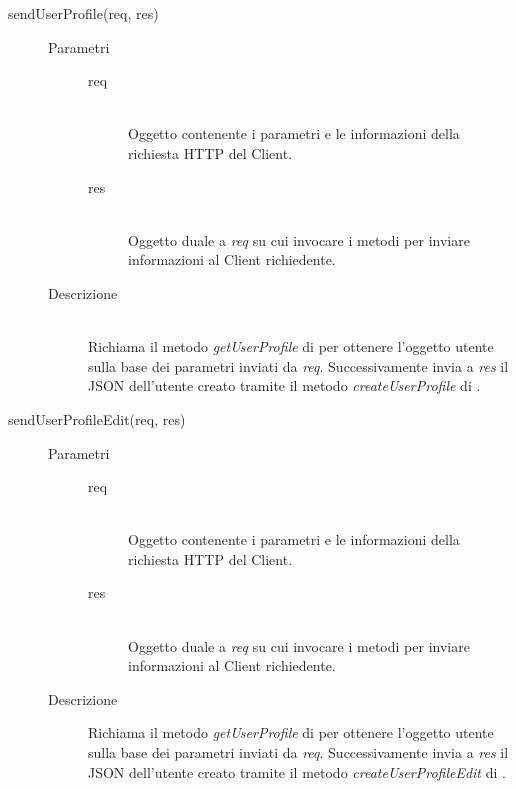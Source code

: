 \begin{description}
\begin{description}
    \item[sendUserProfile(req, res)] \hfill
      \begin{description}
	\item[Parametri] \hfill
	  \begin{description}
	    \item[req] \hfill \\
	    Oggetto contenente i parametri e le informazioni della richiesta HTTP del Client.
	    \item[res] \hfill \\
	    Oggetto duale a \textit{req} su cui invocare i metodi per inviare informazioni al Client richiedente.
	  \end{description}
	\item[Descrizione] \hfill \\
	Richiama il metodo \textit{getUserProfile} di  per ottenere l'oggetto utente sulla base dei parametri inviati da \textit{req}. Successivamente invia a \textit{res} il JSON dell'utente 	creato tramite il metodo \textit{createUserProfile} di .
      \end{description}
      
    \item[sendUserProfileEdit(req, res)] \hfill
      \begin{description}
	\item[Parametri] \hfill
	  \begin{description}
	    \item[req] \hfill \\
	    Oggetto contenente i parametri e le informazioni della richiesta HTTP del Client.
	    \item[res] \hfill \\
	    Oggetto duale a \textit{req} su cui invocare i metodi per inviare informazioni al Client richiedente.
	  \end{description}
	\item[Descrizione]
	Richiama il metodo \textit{getUserProfile} di  per ottenere l'oggetto utente sulla base dei parametri inviati da \textit{req}. Successivamente invia a \textit{res} il JSON dell'utente 	creato tramite il metodo \textit{createUserProfileEdit} di .
      \end{description}
      

\end{description}
\end{description}
